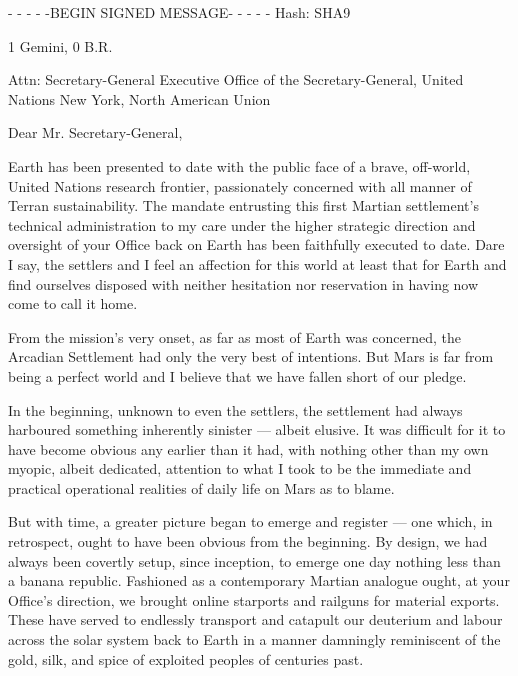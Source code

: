
\startlines
- - - - -BEGIN SIGNED MESSAGE- - - - -
Hash: SHA9

1 Gemini, 0 B.R.

Attn: Secretary-General
Executive Office of the Secretary-General, United Nations
New York, North American Union
\blank

Dear Mr. Secretary-General,

Earth has been presented to date with the public face of a brave, off-world, United Nations research frontier, passionately concerned with all manner of Terran sustainability. The mandate entrusting this first Martian settlement's technical administration to my care under the higher strategic direction and oversight of your Office back on Earth has been faithfully executed to date. Dare I say, the settlers and I feel an affection for this world at least that for Earth and find ourselves disposed with neither hesitation nor reservation in having now come to call it home.

From the mission's very onset, as far as most of Earth was concerned, the Arcadian Settlement had only the very best of intentions. But Mars is far from being a perfect world and I believe that we have fallen short of our pledge.

In the beginning, unknown to even the settlers, the settlement had always harboured something inherently sinister — albeit elusive. It was difficult for it to have become obvious any earlier than it had, with nothing other than my own myopic, albeit dedicated, attention to what I took to be the immediate and practical operational realities of daily life on Mars as to blame.

But with time, a greater picture began to emerge and register — one which, in retrospect, ought to have been obvious from the beginning. By design, we had always been covertly setup, since inception, to emerge one day nothing less than a banana republic. Fashioned as a contemporary Martian analogue ought, at your Office's direction, we brought online starports and railguns for material exports. These have served to endlessly transport and catapult our deuterium and labour across the solar system back to Earth in a manner damningly reminiscent of the gold, silk, and spice of exploited peoples of centuries past.

